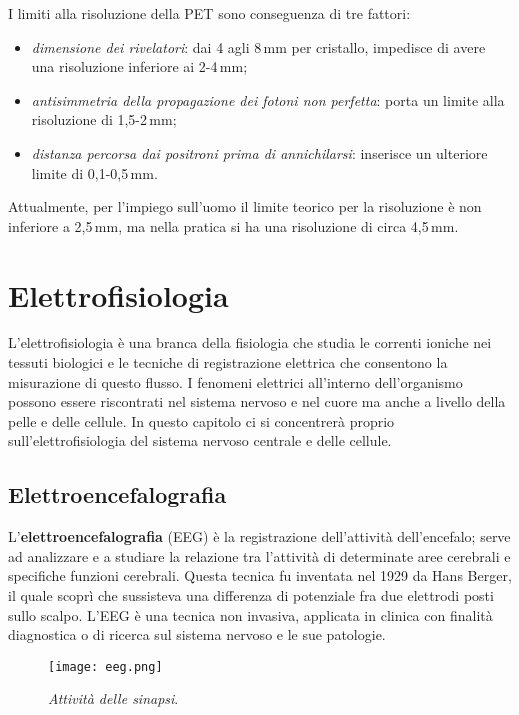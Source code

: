 \documentclass{report}
\numberwithin{equation}{section}
\numberwithin{figure}{section}
\begin{document}
I limiti alla risoluzione della PET sono conseguenza di tre fattori:
\begin{itemize}[label=$-$]
    \item \emph{dimensione dei rivelatori}: dai 4 agli 8\,mm per cristallo, impedisce di avere una risoluzione inferiore ai 2-4\,mm;
    \item \emph{antisimmetria della propagazione dei fotoni non perfetta}: porta un limite alla risoluzione di 1,5-2\,mm;
    \item \emph{distanza percorsa dai positroni prima di annichilarsi}: inserisce un ulteriore limite di 0,1-0,5\,mm.
\end{itemize}
Attualmente, per l’impiego sull'uomo il limite teorico per la risoluzione è non inferiore a 2,5\,mm, ma nella pratica si ha una risoluzione di circa 4,5\,mm.

\clearpage
\null
\newpage

\chapter{Elettrofisiologia}
L'elettrofisiologia è una branca della fisiologia che studia le correnti ioniche nei tessuti biologici e le tecniche di registrazione elettrica che consentono la misurazione di questo flusso. I fenomeni elettrici all'interno dell'organismo possono essere riscontrati nel sistema nervoso e nel cuore ma anche a livello della pelle e delle cellule. In questo capitolo ci si concentrerà proprio sull'elettrofisiologia del sistema nervoso centrale e delle cellule.

\section{Elettroencefalografia}
L'\textbf{elettroencefalografia} (EEG) è la registrazione dell'attività dell'encefalo; serve ad analizzare e a studiare la relazione tra l’attività di determinate aree cerebrali e specifiche funzioni cerebrali. Questa tecnica fu inventata nel 1929 da Hans Berger, il quale scoprì che sussisteva una differenza di potenziale fra due elettrodi posti sullo scalpo. L'EEG è una tecnica non invasiva, applicata in clinica con finalità diagnostica o di ricerca sul sistema nervoso e le sue patologie.

\begin{figure}[htp]
    \centering
    \texttt{[image: eeg.png]}
    \caption{\label{fig:eeg} \textit{Attività delle sinapsi}.}
\end{figure}
\end{document}
